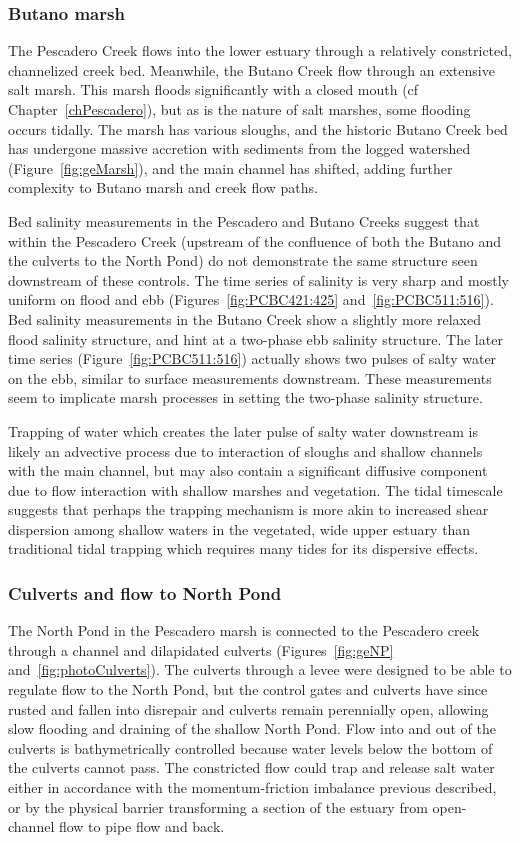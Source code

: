 \subsubsection{Butano marsh}
The Pescadero Creek flows into the lower estuary through a relatively constricted, channelized creek bed.  Meanwhile, the Butano Creek flow through an extensive salt marsh. This marsh floods significantly with a closed mouth (cf Chapter~\ref{chPescadero}), but as is the nature of salt marshes, some flooding occurs tidally. The marsh has various sloughs, and the historic Butano Creek bed has undergone massive accretion with sediments from the logged watershed (Figure~\ref{fig:geMarsh}), and the main channel has shifted, adding further complexity to Butano marsh and creek flow paths.

Bed salinity measurements in the Pescadero and Butano Creeks suggest that within the Pescadero Creek (upstream of the confluence of both the Butano and the culverts to the North Pond) do not demonstrate the same structure seen downstream of these controls. The time series of salinity is very sharp and mostly uniform on flood and ebb (Figures~\ref{fig:PCBC421:425} and~\ref{fig:PCBC511:516}). Bed salinity measurements in the Butano Creek show a slightly more relaxed flood salinity structure, and hint at a two-phase ebb salinity structure. The later time series (Figure~\ref{fig:PCBC511:516}) actually shows two pulses of salty water on the ebb, similar to surface measurements downstream. These measurements seem to implicate marsh processes in setting the two-phase salinity structure.

Trapping of water which creates the later pulse of salty water downstream is likely an advective process due to interaction of sloughs and shallow channels with the main channel, but may also contain a significant diffusive component due to flow interaction with shallow marshes and vegetation. The tidal timescale suggests that perhaps the trapping mechanism is more akin to increased shear dispersion among shallow waters in the vegetated, wide upper estuary than traditional tidal trapping which requires many tides for its dispersive effects. 

\subsubsection{Culverts and flow to North Pond}
The North Pond in the Pescadero marsh is connected to the Pescadero creek through a channel and dilapidated culverts (Figures~\ref{fig:geNP} and~\ref{fig:photoCulverts}). The culverts through a levee were designed to be able to regulate flow to the North Pond, but the control gates and culverts have since rusted and fallen into disrepair and culverts remain perennially open, allowing slow flooding and draining of the shallow North Pond. Flow into and out of the culverts is bathymetrically controlled because water levels below the bottom of the culverts cannot pass. The constricted flow could trap and release salt water either in accordance with the momentum-friction imbalance previous described, or by the physical barrier transforming a section of the estuary from open-channel flow to pipe flow and back. 

